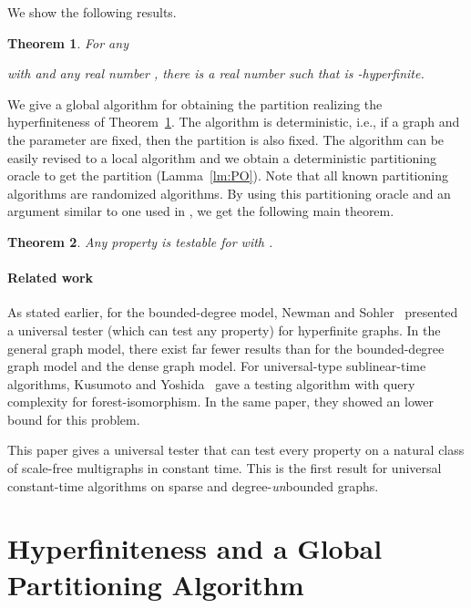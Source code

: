 \documentclass[11pt]{article}
\newtheorem{thm}{Theorem}[section]
\begin{document}
We show the following results. 


\begin{thm}\label{th:hyperfinite}
For any 
 
with  
and any real number , 
there is a real number  
such that 
 is 
-hyperfinite. 
\end{thm}


We give a global algorithm for obtaining the partition realizing the hyperfiniteness of Theorem~\ref{th:hyperfinite}.  
The algorithm is deterministic, i.e., 
if a graph and the parameter  are fixed, 
then the partition is also fixed. 
The algorithm can be easily revised to a local algorithm and we obtain a deterministic partitioning oracle to get the partition (Lamma~\ref{lm:PO}).  
Note that all known partitioning algorithms
are randomized algorithms.  
By using this partitioning oracle and an argument similar to one used in \cite{NS_Testable_SJCOMP13}, we get the following main theorem. 


\begin{thm}\label{th:testable}
Any property is testable 
for  
with . 
\end{thm}



\paragraph{Related work}
As stated earlier, for the bounded-degree model, Newman and Sohler~\cite{NS_Testable_SJCOMP13} presented a universal tester (which can test any property) 
for hyperfinite graphs.  
In the general graph model, there exist far fewer results than for the bounded-degree graph model and the dense graph model. 
For universal-type sublinear-time algorithms, 
Kusumoto and Yoshida~\cite{Kusumoto-Yoshida-ICALP14} gave 
a testing algorithm with  query complexity for 
forest-isomorphism. In the same paper, they showed an  lower bound for this problem.  

This paper gives a universal tester that can test every property on a natural class of scale-free multigraphs in constant time. 
This is the first result for universal constant-time algorithms on sparse and degree-{\em un}bounded graphs. 






\section{Hyperfiniteness and a Global Partitioning Algorithm}
\end{document}
